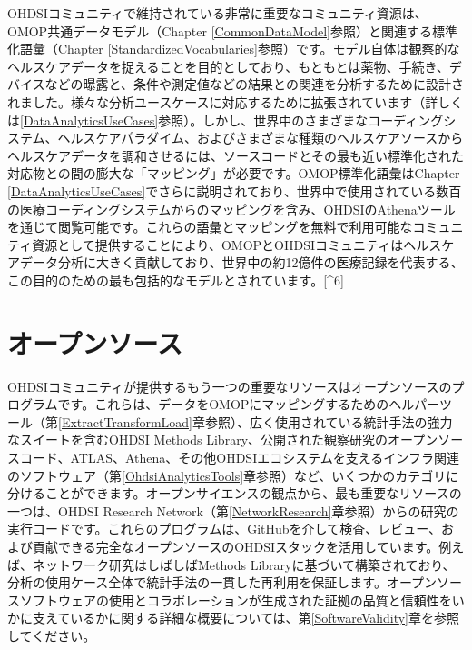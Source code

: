 \documentclass[
  11pt]{book}
\theoremstyle{definition}
\theoremstyle{definition}
\theoremstyle{definition}
\theoremstyle{definition}
\theoremstyle{remark}
\begin{document}

OHDSIコミュニティで維持されている非常に重要なコミュニティ資源は、OMOP共通データモデル（Chapter \ref{CommonDataModel}参照）と関連する標準化語彙（Chapter \ref{StandardizedVocabularies}参照）です。モデル自体は観察的なヘルスケアデータを捉えることを目的としており、もともとは薬物、手続き、デバイスなどの曝露と、条件や測定値などの結果との関連を分析するために設計されました。様々な分析ユースケースに対応するために拡張されています（詳しくは\ref{DataAnalyticsUseCases}参照）。しかし、世界中のさまざまなコーディングシステム、ヘルスケアパラダイム、およびさまざまな種類のヘルスケアソースからヘルスケアデータを調和させるには、ソースコードとその最も近い標準化された対応物との間の膨大な「マッピング」が必要です。OMOP標準化語彙はChapter \ref{DataAnalyticsUseCases}でさらに説明されており、世界中で使用されている数百の医療コーディングシステムからのマッピングを含み、OHDSIのAthenaツールを通じて閲覧可能です。これらの語彙とマッピングを無料で利用可能なコミュニティ資源として提供することにより、OMOPとOHDSIコミュニティはヘルスケアデータ分析に大きく貢献しており、世界中の約12億件の医療記録を代表する、この目的のための最も包括的なモデルとされています。{[}\^{}6{]} \citep{garza_2016}

\section{オープンソース}\label{ux30aaux30fcux30d7ux30f3ux30bdux30fcux30b9}


OHDSIコミュニティが提供するもう一つの重要なリソースはオープンソースのプログラムです。これらは、データをOMOPにマッピングするためのヘルパーツール（第\ref{ExtractTransformLoad}章参照）、広く使用されている統計手法の強力なスイートを含むOHDSI Methods Library、公開された観察研究のオープンソースコード、ATLAS、Athena、その他OHDSIエコシステムを支えるインフラ関連のソフトウェア（第\ref{OhdsiAnalyticsTools}章参照）など、いくつかのカテゴリに分けることができます。オープンサイエンスの観点から、最も重要なリソースの一つは、OHDSI Research Network（第\ref{NetworkResearch}章参照）からの研究の実行コードです。これらのプログラムは、GitHubを介して検査、レビュー、および貢献できる完全なオープンソースのOHDSIスタックを活用しています。例えば、ネットワーク研究はしばしばMethods Libraryに基づいて構築されており、分析の使用ケース全体で統計手法の一貫した再利用を保証します。オープンソースソフトウェアの使用とコラボレーションが生成された証拠の品質と信頼性をいかに支えているかに関する詳細な概要については、第\ref{SoftwareValidity}章を参照してください。
\end{document}
